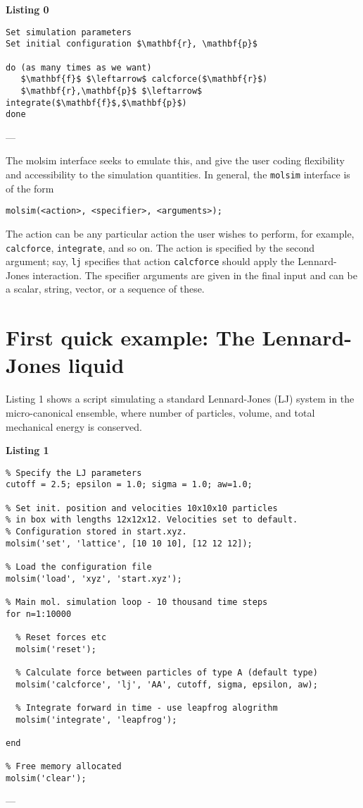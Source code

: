 \documentclass[11pt]{article}
\begin{document}
\bigskip

\noindent \textbf{Listing 0}
\begin{lstlisting}
Set simulation parameters
Set initial configuration $\mathbf{r}, \mathbf{p}$

do (as many times as we want)
   $\mathbf{f}$ $\leftarrow$ calcforce($\mathbf{r}$)
   $\mathbf{r},\mathbf{p}$ $\leftarrow$ integrate($\mathbf{f}$,$\mathbf{p}$)
done
\end{lstlisting}
---

\noindent The \textsf{molsim} interface seeks to emulate this, and give the user
coding flexibility and accessibility to the simulation quantities. In general,
the \verb!molsim! interface is of the form
\begin{verbatim}
molsim(<action>, <specifier>, <arguments>);
\end{verbatim}
The action can be any particular action the user wishes to perform, for example,
\verb!calcforce!, \verb!integrate!, and so on. The action is specified by the
second argument; say, \verb!lj! specifies that action \verb!calcforce! should
apply the Lennard-Jones interaction. The specifier arguments are given in the
final input and can be a scalar, string, vector, or a sequence of these.

\section{First quick example: The Lennard-Jones liquid}
Listing 1 shows a script simulating a standard Lennard-Jones (LJ) system in the
micro-canonical ensemble, where number of particles, volume, and total
mechanical energy is conserved.

\bigskip

\noindent \textbf{Listing 1}
\begin{verbatim}
% Specify the LJ parameters
cutoff = 2.5; epsilon = 1.0; sigma = 1.0; aw=1.0;

% Set init. position and velocities 10x10x10 particles 
% in box with lengths 12x12x12. Velocities set to default. 
% Configuration stored in start.xyz. 
molsim('set', 'lattice', [10 10 10], [12 12 12]);

% Load the configuration file
molsim('load', 'xyz', 'start.xyz');

% Main mol. simulation loop - 10 thousand time steps
for n=1:10000

  % Reset forces etc
  molsim('reset');

  % Calculate force between particles of type A (default type)
  molsim('calcforce', 'lj', 'AA', cutoff, sigma, epsilon, aw);

  % Integrate forward in time - use leapfrog alogrithm
  molsim('integrate', 'leapfrog');
 
end

% Free memory allocated
molsim('clear');
\end{verbatim}
---
\end{document}
